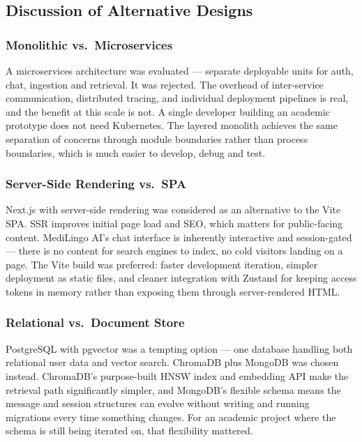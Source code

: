 \subsection{Discussion of Alternative Designs}

\subsubsection{Monolithic vs.\ Microservices}

A microservices architecture was evaluated --- separate deployable units for auth, chat,
ingestion and retrieval. It was rejected. The overhead of inter-service communication,
distributed tracing, and individual deployment pipelines is real, and the benefit at this
scale is not. A single developer building an academic prototype does not need Kubernetes.
The layered monolith achieves the same separation of concerns through module boundaries
rather than process boundaries, which is much easier to develop, debug and test.

\subsubsection{Server-Side Rendering vs.\ SPA}

Next.js with server-side rendering was considered as an alternative to the Vite SPA. SSR
improves initial page load and SEO, which matters for public-facing content. MediLingo AI's
chat interface is inherently interactive and session-gated --- there is no content for
search engines to index, no cold visitors landing on a page. The Vite build was preferred:
faster development iteration, simpler deployment as static files, and cleaner integration
with Zustand for keeping access tokens in memory rather than exposing them through
server-rendered HTML.

\subsubsection{Relational vs.\ Document Store}

PostgreSQL with pgvector was a tempting option --- one database handling both relational
user data and vector search. ChromaDB plus MongoDB was chosen instead. ChromaDB's
purpose-built HNSW index and embedding API make the retrieval path significantly
simpler, and MongoDB's flexible schema means the message and session structures can
evolve without writing and running migrations every time something changes. For an
academic project where the schema is still being iterated on, that flexibility mattered.

